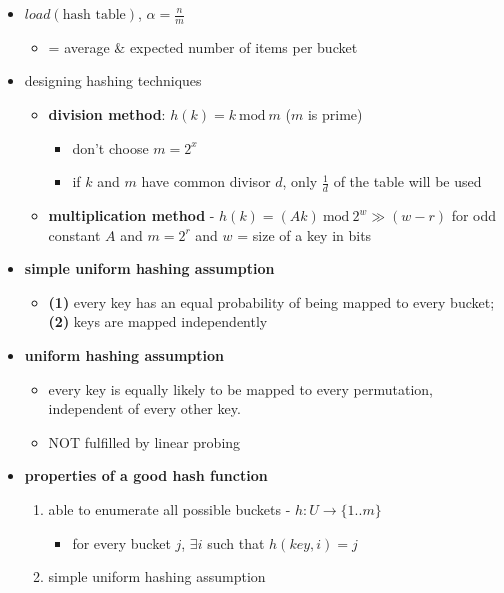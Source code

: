 \documentclass[10pt, landscape]{article}
\newcommand{\Mod}[1]{\ \mathrm{mod}\ #1}
\begin{document}
\begin{multicols}{4}
\begin{itemize}
    \item $load(\text{hash table})$, $\alpha = \frac{n}{m}$ 
    \begin{itemize}
        \item = average \& expected number of items per bucket
    \end{itemize}
    \item designing hashing techniques
    \begin{itemize}
        \item \textbf{division method}: $h(k) = k \Mod{m}$ ($m$ is prime)
        \begin{itemize}
            \item don't choose $m = 2^x$
            \item if $k$ and $m$ have common divisor $d$, only $\frac{1}{d}$ of the table will be used
        \end{itemize}
        \item \textbf{multiplication method} - $h(k) = (Ak) \Mod{2^w} \gg (w-r)$ 
        for odd constant $A$ and $m = 2^r$ and $w$ = size of a key in bits
    \end{itemize}
    \item \textbf{simple uniform hashing assumption} 
    \begin{itemize}
        \item \textbf{(1)} every key has an equal probability of being mapped to every bucket; \textbf{(2)} keys are mapped independently
    \end{itemize}
    \item \textbf{uniform hashing assumption} 
    \begin{itemize}
        \item every key is equally likely to be mapped to every permutation, independent of every other key.
        \item NOT fulfilled by linear probing
    \end{itemize}
    \item \textbf{properties of a good hash function}
    \begin{enumerate}
        \item able to enumerate all possible buckets - $h:U \to \{1..m\}$
        \begin{itemize}
            \item for every bucket $j$, $\exists i$ such that $h(key, i) = j$
        \end{itemize}
        \item simple uniform hashing assumption
    \end{enumerate}
\end{itemize}


\end{multicols}
\end{document}
